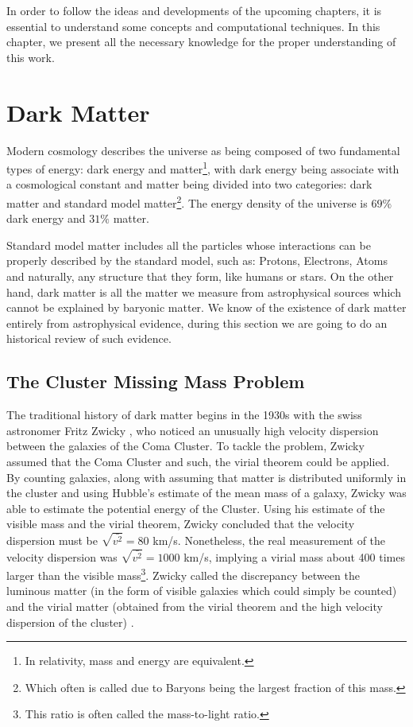 \newpage
In order to follow the ideas and developments of the upcoming chapters, it is essential to understand some concepts and computational techniques.
In this chapter, we present all the necessary knowledge for the proper understanding of this work.

\section{Dark Matter}
Modern cosmology describes the universe as being composed of two fundamental types of energy: dark energy and matter\footnote{In relativity, mass and energy are equivalent.}, with dark energy being associate with a cosmological constant and matter being divided into two categories: dark matter and standard model matter\footnote{Which often is called  due to Baryons being the largest fraction of this mass.}.
The energy density of the universe is $69\%$ dark energy and $31\%$ matter\cite{2014AA571A16P}.


Standard model matter includes all the particles whose interactions can be properly described by the standard model, such as: Protons, Electrons, Atoms and naturally, any structure that they form, like humans or stars.
On the other hand, dark matter is all the matter we measure from astrophysical sources which cannot be explained by baryonic matter.
We know of the existence of dark matter entirely from astrophysical evidence, during this section we are going to do an historical review of such evidence.

\subsection{The Cluster Missing Mass Problem}
The traditional history of dark matter begins in the 1930s with the swiss astronomer Fritz Zwicky\cite{aHistory} \cite{tasiCline}, who noticed an unusually high velocity dispersion between the galaxies of the Coma Cluster.
To tackle the problem, Zwicky assumed that the Coma Cluster  \cite{englishZwicky} and such, the virial theorem could be applied.
By counting galaxies, along with assuming that matter is distributed uniformly in the cluster and using Hubble's estimate of the mean mass of a galaxy, Zwicky was able to estimate the potential energy of the Cluster.
Using his estimate of the visible mass and the virial theorem, Zwicky concluded that the velocity dispersion must be $\sqrt{\bar{v^2}} = 80$ km/s.
Nonetheless, the real measurement of the velocity dispersion was $\sqrt{\bar{v^2}} = 1000$ km/s, implying a virial mass about 400 times larger than the visible mass\footnote{This ratio is often called the mass-to-light ratio.}.
Zwicky called the discrepancy between the luminous matter (in the form of visible galaxies which could simply be counted) and the virial matter (obtained from the virial theorem and the high velocity dispersion of the cluster) .

